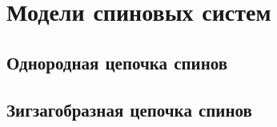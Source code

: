 \section{Модели спиновых систем}
\subsection{Однородная цепочка спинов}





\subsection{Зигзагобразная цепочка спинов}


